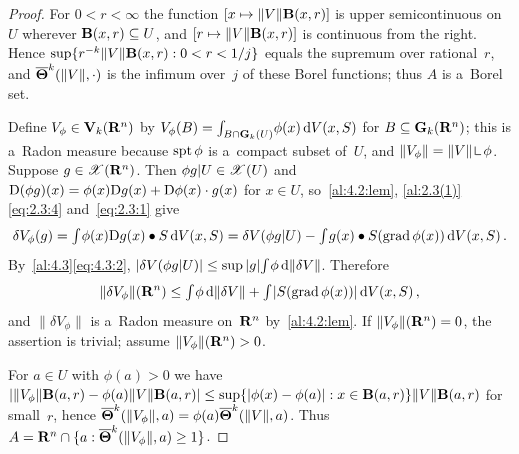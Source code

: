 \begin{proof}
    For $0 < r < \infty$ the function $[x \mapsto \|V\| \mathbf{B}(x,r)]$ is upper semicontinuous on~$U$
    wherever $\mathbf{B}(x,r) \subseteq U$, and $[r \mapsto \|V\| \mathbf{B}(x,r)]$ is continuous from the
    right. Hence $\sup \{ r^{-k} \|V\| \mathbf{B}(x,r) : 0 < r < 1/j \}$ equals the supremum over
    rational~$r$, and $\boldsymbol{\overline{\Theta}}^{k}(\|V\|,\cdot)$ is the infimum over~$j$ of these Borel
    functions; thus $A$ is a~Borel set.

    Define $V_\phi \in \mathbf{V}_{k}(\mathbf{R}^{n})$ by $V_\phi(B) = {\textstyle\int_{B \cap \mathbf{G}_{k}(U)}^{}} \phi(x)
    \,\mathrm{d} V(x,S)$ for $B \subseteq \mathbf{G}_{k}(\mathbf{R}^{n})$; this is a~Radon measure because $\operatorname{spt} \phi$ is
    a~compact subset of~$U$, and $\|V_\phi\| = \|V\| \restrict \phi$. Suppose $g \in
    \mathscr{X}(\mathbf{R}^{n})$. Then $\phi g | U \in \mathscr{X}(U)$ and $\mathrm{D}(\phi g)(x) = \phi(x) \mathrm{D} g(x) + \mathrm{D}
    \phi(x) \cdot g(x)$ for $x \in U$, so~\ref{al:4.2:lem}, \ref{al:2.3(1)}\eqref{eq:2.3:4}
    and~\eqref{eq:2.3:1} give
    \begin{displaymath}
        \delta V_\phi(g) = {\textstyle\int_{}^{}} \phi(x) \mathrm{D} g(x) \bullet S \,\mathrm{d} V(x,S) = \delta V(\phi g|U) -
        {\textstyle\int_{}^{}} g(x) \bullet S(\operatorname{grad} \phi(x)) \,\mathrm{d} V(x,S) \,.
    \end{displaymath}
    By~\ref{al:4.3}\eqref{eq:4.3:2}, $|\delta V(\phi g | U)| \le \sup |g| {\textstyle\int_{}^{}} \phi \,\mathrm{d}
    \|\delta V\|$. Therefore
    \begin{displaymath}
        \|\delta V_\phi\|(\mathbf{R}^{n}) \le {\textstyle\int_{}^{}} \phi \,\mathrm{d} \|\delta V\| + {\textstyle\int_{}^{}}
        |S(\operatorname{grad} \phi(x))| \,\mathrm{d} V(x,S) \,,
    \end{displaymath}
    and $\|\delta V_\phi\|$ is a~Radon measure on~$\mathbf{R}^{n}$ by~\ref{al:4.2:lem}. If $\|V_\phi\|(\mathbf{R}^{n})
    = 0$, the assertion is trivial; assume $\|V_\phi\|(\mathbf{R}^{n}) > 0$.

    For $a \in U$ with $\phi(a) > 0$ we have $|\|V_\phi\| \mathbf{B}(a,r) - \phi(a) \|V\|
    \mathbf{B}(a,r)| \le \sup \{ |\phi(x) - \phi(a)| : x \in \mathbf{B}(a,r) \} \|V\| \mathbf{B}(a,r)$ for
    small~$r$, hence $\boldsymbol{\overline{\Theta}}^{k}(\|V_\phi\|,a) = \phi(a) \boldsymbol{\overline{\Theta}}^{k}(\|V\|,a)$. Thus
    $A = \mathbf{R}^{n} \cap \{ a : \boldsymbol{\overline{\Theta}}^{k}(\|V_\phi\|,a) \ge 1 \}$.


\end{proof}
